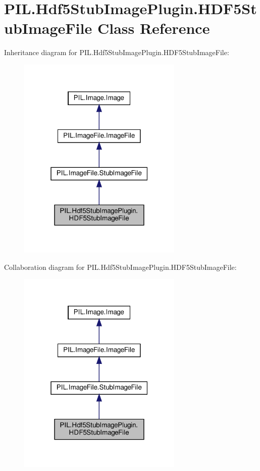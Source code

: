\hypertarget{classPIL_1_1Hdf5StubImagePlugin_1_1HDF5StubImageFile}{}\section{P\+I\+L.\+Hdf5\+Stub\+Image\+Plugin.\+H\+D\+F5\+Stub\+Image\+File Class Reference}
\label{classPIL_1_1Hdf5StubImagePlugin_1_1HDF5StubImageFile}


Inheritance diagram for P\+I\+L.\+Hdf5\+Stub\+Image\+Plugin.\+H\+D\+F5\+Stub\+Image\+File\+:
\nopagebreak
\begin{figure}[H]
\begin{center}
\leavevmode
\includegraphics[width=223pt]{classPIL_1_1Hdf5StubImagePlugin_1_1HDF5StubImageFile__inherit__graph}
\end{center}
\end{figure}


Collaboration diagram for P\+I\+L.\+Hdf5\+Stub\+Image\+Plugin.\+H\+D\+F5\+Stub\+Image\+File\+:
\nopagebreak
\begin{figure}[H]
\begin{center}
\leavevmode
\includegraphics[width=223pt]{classPIL_1_1Hdf5StubImagePlugin_1_1HDF5StubImageFile__coll__graph}
\end{center}
\end{figure}
